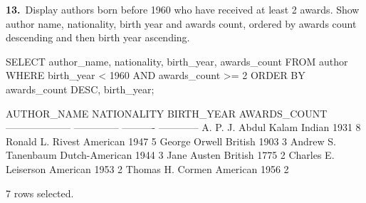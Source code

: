 \noindent\begin{minipage}{\linewidth}
\begingroup{}
{\fontsize{14}{17}\selectfont\textbf{13.}}\ Display authors born before 1960 who have received at least 2 awards. Show author name, nationality, birth year and awards count, ordered by awards count descending and then birth year ascending.\par
\endgroup\vspace{12pt}


\begin{sqlcode}
SELECT author_name, nationality, birth_year, awards_count
FROM author
WHERE birth_year < 1960
  AND awards_count >= 2
ORDER BY awards_count DESC, birth_year;
\end{sqlcode}

\vspace{18pt}


\begin{sqlout}[fontsize=\small]
AUTHOR_NAME           NATIONALITY     BIRTH_YEAR  AWARDS_COUNT
--------------------  --------------  ----------  ------------
A. P. J. Abdul Kalam  Indian                1931             8
Ronald L. Rivest      American              1947             5
George Orwell         British               1903             3
Andrew S. Tanenbaum   Dutch-American        1944             3
Jane Austen           British               1775             2
Charles E. Leiserson  American              1953             2
Thomas H. Cormen      American              1956             2

7 rows selected.
\end{sqlout}
\end{minipage}\par\vspace{24pt}

